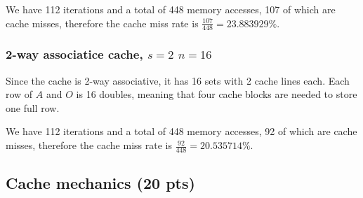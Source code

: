 We have 112 iterations and a total of 448 memory accesses, 107 of which are cache misses, therefore the cache miss rate is $\frac{107}{448} = 23.883929\%$.\vspace*{-0.4cm}

\subsubsection{2-way associatice cache, $s=2$ $n=16$}
Since the cache is 2-way associative, it has 16 sets with 2 cache lines each. Each row of $A$ and $O$ is 16 doubles, meaning that four cache blocks are needed to store one full row.

We have 112 iterations and a total of 448 memory accesses, 92 of which are cache misses, therefore the cache miss rate is $\frac{92}{448} = 20.535714\%$.\vspace*{-0.4cm}


\subsection{Cache mechanics (20 pts)}
